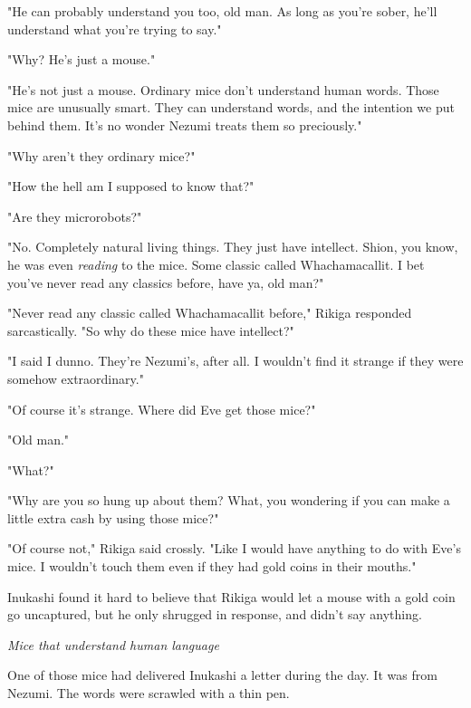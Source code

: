 "He can probably understand you too, old man. As long as you're sober,
he'll understand what you're trying to say."

"Why? He's just a mouse."

"He's not just a mouse. Ordinary mice don't understand human words.
Those mice are unusually smart. They can understand words, and the
intention we put behind them. It's no wonder Nezumi treats them so
preciously."

"Why aren't they ordinary mice?"

"How the hell am I supposed to know that?"

"Are they microrobots?"

"No. Completely natural living things. They just have intellect. Shion,
you know, he was even \emph{reading} to the mice. Some classic called
Whachamacallit. I bet you've never read any classics before, have ya,
old man?"

"Never read any classic called Whachamacallit before," Rikiga responded
sarcastically. "So why do these mice have intellect?"

"I said I dunno. They're Nezumi's, after all. I wouldn't find it strange
if they were somehow extraordinary."

"Of course it's strange. Where did Eve get those mice?"

"Old man."

"What?"

"Why are you so hung up about them? What, you wondering if you can make
a little extra cash by using those mice?"

"Of course not," Rikiga said crossly. "Like I would have anything to do
with Eve's mice. I wouldn't touch them even if they had gold coins in
their mouths."

Inukashi found it hard to believe that Rikiga would let a mouse with a
gold coin go uncaptured, but he only shrugged in response, and didn't
say anything.

\emph{Mice that understand human language\el }

One of those mice had delivered Inukashi a letter during the day. It was
from Nezumi. The words were scrawled with a thin pen.


